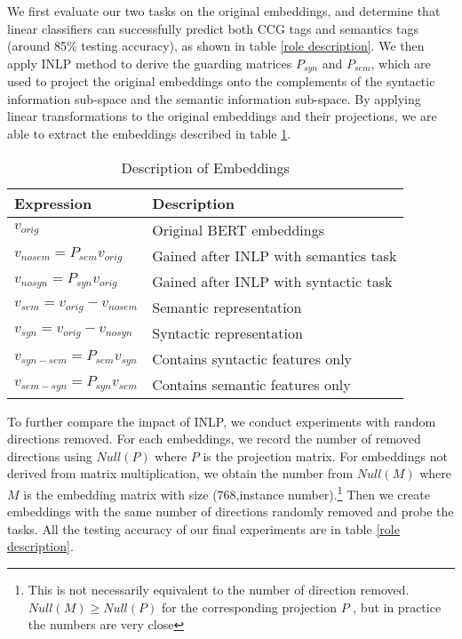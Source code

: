 \documentclass[11pt,a4paper]{article}
\begin{document}
We first evaluate our two tasks on the original embeddings, and determine that linear classifiers can successfully predict both CCG tags and semantics tags (around 85\% testing accuracy), as shown in table \ref{role description}. We then apply INLP method to derive the guarding matrices $P_{syn}$ and $P_{sem}$, which are used to project the original embeddings onto the complements of the syntactic information sub-space and the semantic information sub-space. By applying linear transformations to the original embeddings and their projections, we are able to extract the embeddings described in table \ref{description}. 
\begin{table}[ht]
    \centering
    \begin{tabular}{p{4cm}p{3cm}}\hline
        \textbf{Expression} & \textbf{Description}\\ \hline 
        $v_{orig}$ & Original BERT embeddings  \\
        $v_{nosem} = P_{sem} v_{orig}$ & Gained after INLP with semantics task \\
        $v_{nosyn}= P_{syn} v_{orig}$ & Gained after INLP with syntactic task \\
        $v_{sem} = v_{orig}-v_{nosem}$ & Semantic representation \\
        $v_{syn} = v_{orig}-v_{nosyn}$ & Syntactic representation \\
        $v_{syn-sem} = P_{sem} v_{syn}$ &Contains syntactic features only \\
        $v_{sem-syn} = P_{syn} v_{sem}$ &Contains semantic features only \\

        
        
        \hline
    \end{tabular}
    \caption{\label{description} Description of Embeddings
    }
\end{table}

To further compare the impact of INLP, we conduct experiments with random directions removed. For each embeddings, we record the number of removed directions using $Null(P)$ where $P$ is the projection matrix. For embeddings not derived from matrix multiplication, we obtain the number from $Null(M)$ where $M$ is the embedding matrix with size (768,instance number).\footnote{This is not necessarily equivalent to the number of direction removed. $Null(M) \geq Null(P)$ for the corresponding projection $P$ , but in practice the numbers are very close} Then we create embeddings with the same number of directions randomly removed and probe the tasks. All the testing accuracy of our final experiments are in table \ref{role description}.
\end{document}
